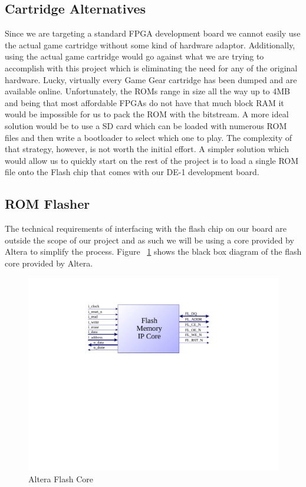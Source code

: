 \documentclass{article}
\begin{document}
\subsection{Cartridge Alternatives}
Since we are targeting a standard FPGA development board we cannot
easily use the actual game cartridge without some kind of hardware adaptor.
Additionally, using the actual game cartridge would go
against what we are trying to accomplish with this project which is
eliminating the need for any of the original hardware. Lucky, virtually
every Game Gear cartridge has been dumped and are available online.
Unfortunately, the ROMs range in size all the way up to 4MB and being that
most affordable FPGAs do not have that much block RAM it would be
impossible for us to pack the ROM with the bitstream. A more ideal
solution would be to use a SD card which can be loaded with numerous
ROM files and then write a bootloader to select which one to play.
The complexity of that strategy, however, is not worth the initial
effort. A simpler solution which would allow us to quickly start on the
rest of the project is to load a single ROM file onto the Flash chip
that comes with our DE-1 development board.

\subsection{ROM Flasher}
The technical requirements of interfacing with the flash chip on our board
are outside the scope of our project and as such we will be using
a core provided by Altera \cite{flash_core} to simplify the process.
Figure ~\ref{fig:flash_core} shows the black box diagram of the flash core provided
by Altera.

\begin{figure}[H]
\centering
\includegraphics[scale=0.5]{flash_core.pdf}
\caption{Altera Flash Core}
\label{fig:flash_core}
\end{figure}
\end{document}
